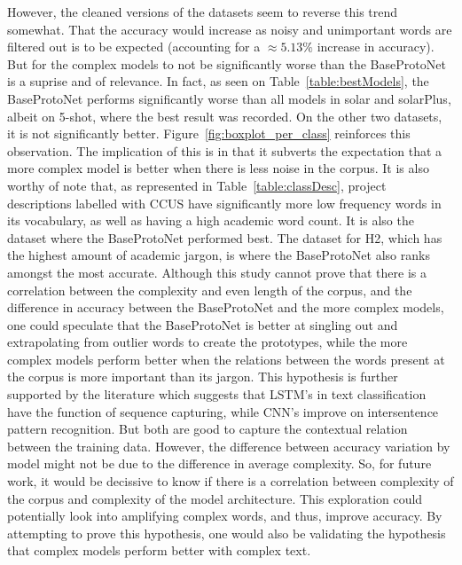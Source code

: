 \documentclass[11pt]{article}
\begin{document}
However, the cleaned versions of the datasets seem to reverse this trend somewhat. That the accuracy would increase as noisy and unimportant words are filtered out is to be expected (accounting for a $\approx 5.13\%$ increase in accuracy). 
But for the complex models to not be significantly worse than the BaseProtoNet is a suprise and of relevance.
In fact, as seen on Table~\ref{table:bestModels}, the BaseProtoNet performs significantly worse than all models in solar and solarPlus, albeit on 5-shot, where the best result was recorded. On the other two datasets, it is not significantly better. Figure~\ref{fig:boxplot_per_class} reinforces this observation.
The implication of this 
is in that it subverts the expectation that a more complex model is better when there is less noise in the corpus. It is also worthy of note that, as represented in Table~\ref{table:classDesc}, project descriptions labelled with CCUS
have significantly more low frequency words in its vocabulary, as well as having a high academic word count. It is also the dataset where the BaseProtoNet performed best. 
The dataset for H2, which has the highest amount of academic jargon, is where the BaseProtoNet also ranks amongst the most accurate. Although this study cannot prove that there is a correlation between the complexity and even length of the corpus, and the difference in accuracy between the BaseProtoNet and the more complex models, one could speculate that the BaseProtoNet is better at singling out and extrapolating from outlier words to create the prototypes, while the more complex models perform better when the relations between the words present at the corpus is more important than its jargon.
This hypothesis 
is further supported 
by the literature which suggests 
that LSTM's in text classification have the function of sequence capturing\cite{Xue2022-pw}, while CNN's improve on intersentence pattern recognition\cite{zhou2015clstmneuralnetworktext}. But both are good to capture the contextual relation between the training data\cite{KAUR2023108699}.
However, the difference between accuracy variation by model might not be due to the difference in average complexity. So, for future work, it would be decissive to know if there is a correlation between complexity of the corpus and complexity of the model architecture. This exploration could potentially look into amplifying complex words, and thus, improve accuracy. By attempting to prove this hypothesis, one would also be validating the hypothesis that complex models perform better with complex text.  
\end{document}
